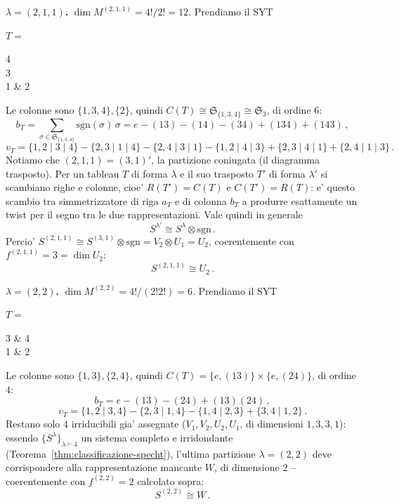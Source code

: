 {  \textbf{$ \lambda = (2,1,1) $.} $ \dim M^{(2,1,1)} = 4!/2! = 12 $. Prendiamo il SYT
  \begin{center}
    $ T = $ \begin{ytableau} 4 \\ 3 \\ 1 & 2 \end{ytableau}
  \end{center}
  Le colonne sono $ \{1,3,4\}, \{2\} $, quindi $ C(T) \cong \mathfrak{S}_{\{1,3,4\}} \cong \mathfrak{S}_3 $, di ordine $6$:
  \[
    b_T = \sum_{\sigma \in \mathfrak{S}_{\{1,3,4\}}} \mathrm{sgn}(\sigma)\, \sigma = e - (13) - (14) - (34) + (134) + (143)\,,
  \]
  \[
    v_T = \{1,2\mid3\mid4\} - \{2,3\mid1\mid4\} - \{2,4\mid3\mid1\} - \{1,2\mid4\mid3\} + \{2,3\mid4\mid1\} + \{2,4\mid1\mid3\}\,.
  \]
  Notiamo che $ (2,1,1) = (3,1)' $, la partizione coniugata (il diagramma trasposto). Per un tableau $ T $ di forma $ \lambda $ e il suo trasposto $ T' $ di forma $ \lambda' $ si scambiano righe e colonne, cioe' $ R(T') = C(T) $ e $ C(T') = R(T) $: e' questo scambio tra simmetrizzatore di riga $ a_T $ e di colonna $ b_T $ a produrre esattamente un twist per il segno tra le due rappresentazioni. Vale quindi in generale
  \[
    S^{\lambda'} \cong S^\lambda \otimes \mathrm{sgn}\,.
  \]
  Percio' $ S^{(2,1,1)} \cong S^{(3,1)} \otimes \mathrm{sgn} = V_2 \otimes U_1 = U_2 $, coerentemente con $ f^{(2,1,1)}=3=\dim U_2 $:
  \[
    S^{(2,1,1)} \cong U_2\,.
  \]

  \textbf{$ \lambda = (2,2) $.} $ \dim M^{(2,2)} = 4!/(2!2!) = 6 $. Prendiamo il SYT
  \begin{center}
    $ T = $ \begin{ytableau} 3 & 4 \\ 1 & 2 \end{ytableau}
  \end{center}
  Le colonne sono $ \{1,3\}, \{2,4\} $, quindi $ C(T) = \{e,(13)\} \times \{e,(24)\} $, di ordine $4$:
  \[
    b_T = e - (13) - (24) + (13)(24)\,,
  \]
  \[
    v_T = \{1,2\mid3,4\} - \{2,3\mid1,4\} - \{1,4\mid2,3\} + \{3,4\mid1,2\}\,.
  \]
  Restano solo $4$ irriducibili gia' assegnate ($ V_1, V_2, U_2, U_1 $, di dimensioni $1,3,3,1$): essendo $ \{S^\lambda\}_{\lambda \vdash 4} $ un sistema completo e irridondante (Teorema~\ref{thm:classificazione-specht}), l'ultima partizione $ \lambda=(2,2) $ deve corrispondere alla rappresentazione mancante $ W $, di dimensione $2$ -- coerentemente con $ f^{(2,2)}=2 $ calcolato sopra:
  \[
    S^{(2,2)} \cong W\,.
  \]
  \Qed
}

